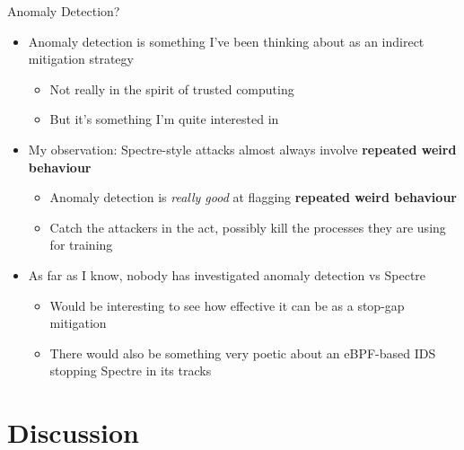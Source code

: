 \documentclass[10pt, dvipsnames, aspectratio=169]{beamer}
\begin{document}
\begin{frame}[c]{Anomaly Detection?}{}
  \begin{itemize}
    \item Anomaly detection is something I've been thinking about as an indirect mitigation strategy
    \begin{itemize}
      \item Not really in the spirit of trusted computing
      \item But it's something I'm quite interested in
    \end{itemize}

    \vfill
    \item My observation: Spectre-style attacks almost always involve {\bf repeated weird behaviour}
    \begin{itemize}
      \item Anomaly detection is {\it really good\/} at flagging {\bf repeated weird behaviour}
      \item Catch the attackers in the act, possibly kill the processes they are using for training
    \end{itemize}

    \vfill
    \item As far as I know, nobody has investigated anomaly detection vs Spectre
    \begin{itemize}
      \item Would be interesting to see how effective it can be as a stop-gap mitigation
      \item There would also be something very poetic about an eBPF-based IDS stopping Spectre in its tracks
    \end{itemize}
  \end{itemize}
\end{frame}

\section{Discussion}
\end{document}
